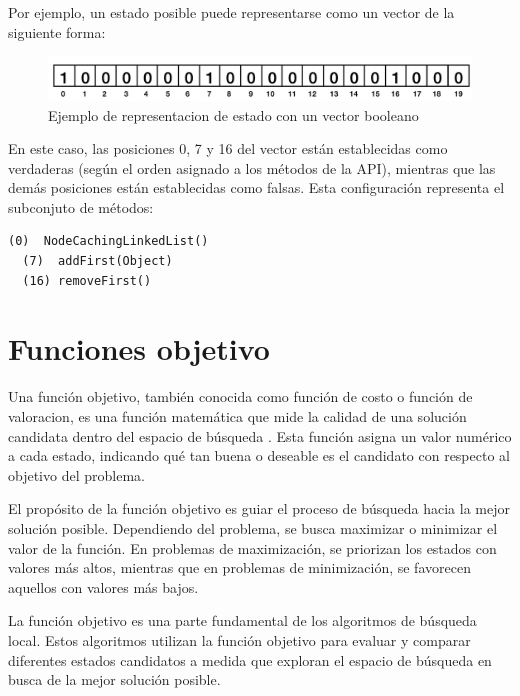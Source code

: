 Por ejemplo, un estado posible puede representarse como un vector de la siguiente forma:


\begin{figure}[H]
  \centering
  \includegraphics[width=1.0\textwidth]{images/cromosoma.png}
  \caption{Ejemplo de representacion de estado con un vector booleano}
  \label{fig:cromosoma}
\end{figure}

En este caso, las posiciones 0, 7 y 16 del vector están establecidas como verdaderas (según el orden asignado a los métodos de la API), mientras que las demás posiciones están establecidas como falsas. Esta configuración representa el subconjuto de métodos:
\vspace{5pt} 

\begin{lstlisting}[numbers=none, caption=Métodos generadores de objetos que representa el cromosoma de la Figura 2, captionpos=b, frame=tb , xleftmargin=0pt, basicstyle=\scriptsize]
  (0)  NodeCachingLinkedList()
  (7)  addFirst(Object)
  (16) removeFirst()
\end{lstlisting}

\section{Funciones objetivo}
\label{sec:fitness}

Una función objetivo, también conocida como función de costo o función de valoracion, es una función matemática que mide la calidad de una solución candidata dentro del espacio de búsqueda \cite{Russell:2009}. Esta función asigna un valor numérico a cada estado, indicando qué tan buena o deseable es el candidato con respecto al objetivo del problema.

El propósito de la función objetivo es guiar el proceso de búsqueda hacia la mejor solución posible. Dependiendo del problema, se busca maximizar o minimizar el valor de la función. En problemas de maximización, se priorizan los estados con valores más altos, mientras que en problemas de minimización, se favorecen aquellos con valores más bajos.

La función objetivo es una parte fundamental de los algoritmos de búsqueda local. Estos algoritmos utilizan la función objetivo para evaluar y comparar diferentes estados candidatos a medida que exploran el espacio de búsqueda en busca de la mejor solución posible.


